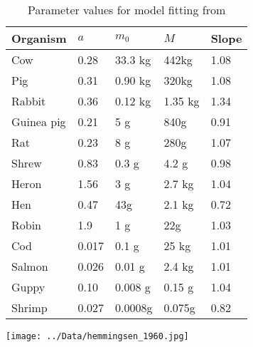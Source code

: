 \documentclass[a4paper]{article} %
\begin{document}
\begin{table}[h]
    \caption{Parameter values for model fitting from \cite{West2001}}
    \begin{center}
    \begin{tabular}{|l|l|l|l|l|}
    \hline
    Organism            & $a$   & $m_0$   & $M$     & Slope \\ \hline
    Cow                 & 0.28  & 33.3 kg & 442kg   & 1.08  \\ \hline
    Pig                 & 0.31  & 0.90 kg & 320kg   & 1.08  \\ \hline
    Rabbit              & 0.36  & 0.12 kg & 1.35 kg & 1.34  \\ \hline
    Guinea pig          & 0.21  & 5 g     & 840g    & 0.91  \\ \hline
    Rat                 & 0.23  & 8 g     & 280g    & 1.07  \\ \hline
    Shrew               & 0.83  & 0.3 g   & 4.2 g   & 0.98  \\ \hline
    Heron               & 1.56  & 3 g     & 2.7 kg  & 1.04  \\ \hline
    Hen                 & 0.47  & 43g     & 2.1 kg  & 0.72  \\ \hline
    Robin               & 1.9   & 1 g     & 22g     & 1.03  \\ \hline
    Cod                 & 0.017 & 0.1 g   & 25 kg   & 1.01  \\ \hline
    Salmon              & 0.026 & 0.01 g  & 2.4 kg  & 1.01  \\ \hline
    Guppy               & 0.10  & 0.008 g & 0.15 g  & 1.04  \\ \hline
    Shrimp              & 0.027 & 0.0008g & 0.075g  & 0.82  \\ \hline
    \end{tabular}
    \end{center}
\end{table}
\begin{center}
    \begin{minipage}{0.6\linewidth}
        \texttt{[image: ../Data/hemmingsen\_1960.jpg]}
    \end{minipage}
\end{center}
\end{document}
